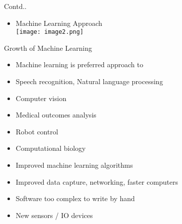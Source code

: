 \documentclass{beamer}
\begin{document}
\begin{frame}{Contd..}
\begin{itemize}
    \item Machine Learning Approach\\
\vspace{10pt}
    \texttt{[image: image2.png]}
\end{itemize}
\end{frame}
\begin{frame}{Growth of Machine Learning}
   \begin{itemize}
       \item Machine learning is preferred approach to
       \item Speech recognition, Natural language processing
       \item Computer vision
       \item Medical outcomes analysis
    \item Robot control
    \item Computational biology
    \item Improved machine learning algorithms
    \item Improved data capture, networking, faster computers
    \item Software too complex to write by hand
    \item New sensors / IO devices
\end{itemize}
\end{frame}
\end{document}
